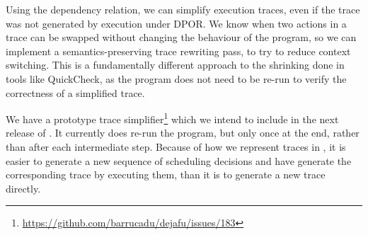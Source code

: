 Using the dependency relation, we can simplify execution traces, even
if the trace was not generated by execution under DPOR.  We know when
two actions in a trace can be swapped without changing the behaviour
of the program, so we can implement a semantics-preserving trace
rewriting pass, to try to reduce context switching.  This is a
fundamentally different approach to the shrinking done in tools like
QuickCheck\cite{claessen2000}, as the program does not need to be
re-run to verify the correctness of a simplified trace.

We have a prototype trace
simplifier\footnote{\url{https://github.com/barrucadu/dejafu/issues/183}}
which we intend to include in the next release of \dejafu{}.  It
currently does re-run the program, but only once at the end, rather
than after each intermediate step.  Because of how we represent traces
in \dejafu{}, it is easier to generate a new sequence of scheduling
decisions and have \dejafu{} generate the corresponding trace by
executing them, than it is to generate a new trace directly.

